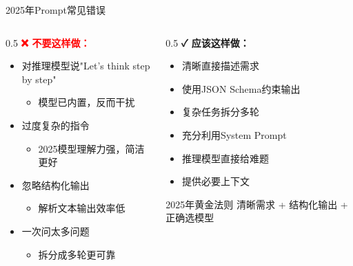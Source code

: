 \documentclass[aspectratio=169,11pt]{beamer}
\begin{document}
\begin{frame}{2025年Prompt常见错误}
    \begin{columns}
        \begin{column}{0.5\textwidth}
            \textbf{\textcolor{red}{❌ 不要这样做：}}
            \begin{itemize}
                \item 对推理模型说"Let's think step by step"
                    \begin{itemize}
                        \item {\scriptsize 模型已内置，反而干扰}
                    \end{itemize}
                \item 过度复杂的指令
                    \begin{itemize}
                        \item {\scriptsize 2025模型理解力强，简洁更好}
                    \end{itemize}
                \item 忽略结构化输出
                    \begin{itemize}
                        \item {\scriptsize 解析文本输出效率低}
                    \end{itemize}
                \item 一次问太多问题
                    \begin{itemize}
                        \item {\scriptsize 拆分成多轮更可靠}
                    \end{itemize}
            \end{itemize}
        \end{column}
        \begin{column}{0.5\textwidth}
            \textbf{\textcolor{green!60!black}{✓ 应该这样做：}}
            \begin{itemize}
                \item 清晰直接描述需求
                \item 使用JSON Schema约束输出
                \item 复杂任务拆分多轮
                \item 充分利用System Prompt
                \item 推理模型直接给难题
                \item 提供必要上下文
            \end{itemize}
            
            \vspace{0.3cm}
            \begin{alertblock}{2025年黄金法则}
                \centering
                \small
                清晰需求 + 结构化输出 + 正确选模型
            \end{alertblock}
        \end{column}
    \end{columns}
\end{frame}
\end{document}

